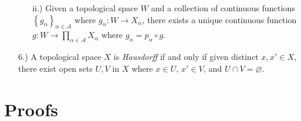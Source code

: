 \documentclass[12pt]{article}
\newcommand{\braces}[1]{\left\{#1\right\}}           %
\begin{document}
\begin{itemize}
\begin{itemize}
        \item [ii.)] Given a topological space $W$ and a collection of continuous functions $\braces{g_\alpha}_{\alpha\in\mathcal{A}}$ where $g_\alpha:W\to X_\alpha$, there exists a unique continuous function $g:W\to\prod_{\alpha\in\mathcal{A}}X_\alpha$ where $g_\alpha=p_\alpha\circ g$.
    \end{itemize}

    \item [6.)] A topological space $X$ is \textit{Hausdorff} if and only if given distinct $x,x'\in X$, there exist open sets $U,V$ in $X$ where $x\in U$, $x'\in V$, and $U\cap V=\varnothing$.
\end{itemize}

\pagebreak
\section*{Proofs}
\end{document}
